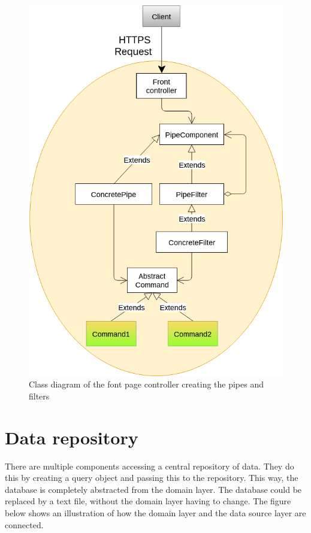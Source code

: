 \begin{figure}[H]
\centering
\includegraphics[width=0.8\linewidth]{7-software/images/FrontClasses.png}
\caption{Class diagram of the font page controller creating the pipes and filters}
\label{fig:frontclasses}
\end{figure}

\section{Data repository}

There are multiple components accessing a central repository of data. They do this by creating a query object and passing this to the repository. This way, the database is completely abstracted from the domain layer. The database could be replaced by a text file, without the domain layer having to change. The figure below shows an illustration of how the domain layer and the data source layer are connected.

